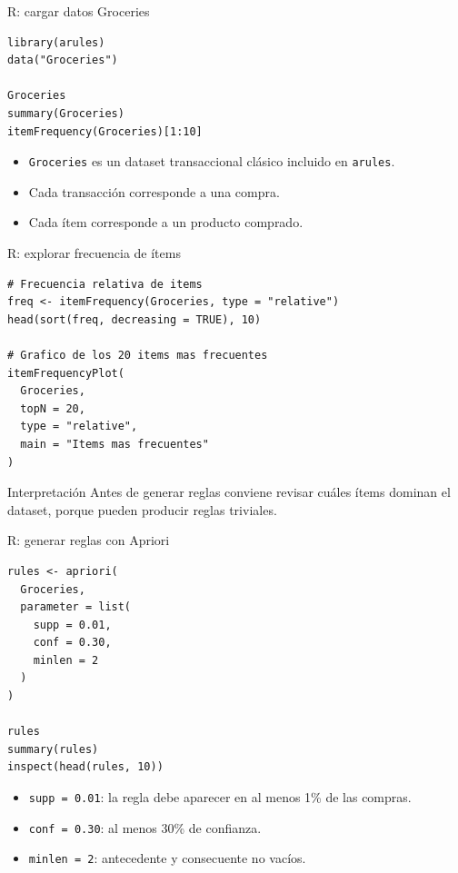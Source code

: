 \documentclass[10pt,aspectratio=169]{beamer}
\begin{document}
\begin{frame}[fragile]{R: cargar datos Groceries}
\begin{lstlisting}[style=Rstyle]
library(arules)
data("Groceries")

Groceries
summary(Groceries)
itemFrequency(Groceries)[1:10]
\end{lstlisting}

\begin{itemize}
  \item \texttt{Groceries} es un dataset transaccional clásico incluido en \texttt{arules}.
  \item Cada transacción corresponde a una compra.
  \item Cada ítem corresponde a un producto comprado.
\end{itemize}
\end{frame}

\begin{frame}[fragile]{R: explorar frecuencia de ítems}
\begin{lstlisting}[style=Rstyle]
# Frecuencia relativa de items
freq <- itemFrequency(Groceries, type = "relative")
head(sort(freq, decreasing = TRUE), 10)

# Grafico de los 20 items mas frecuentes
itemFrequencyPlot(
  Groceries,
  topN = 20,
  type = "relative",
  main = "Items mas frecuentes"
)
\end{lstlisting}

\begin{block}{Interpretación}
Antes de generar reglas conviene revisar cuáles ítems dominan el dataset, porque pueden producir reglas triviales.
\end{block}
\end{frame}

\begin{frame}[fragile]{R: generar reglas con Apriori}
\begin{lstlisting}[style=Rstyle]
rules <- apriori(
  Groceries,
  parameter = list(
    supp = 0.01,
    conf = 0.30,
    minlen = 2
  )
)

rules
summary(rules)
inspect(head(rules, 10))
\end{lstlisting}

\begin{itemize}
  \item \texttt{supp = 0.01}: la regla debe aparecer en al menos 1\% de las compras.
  \item \texttt{conf = 0.30}: al menos 30\% de confianza.
  \item \texttt{minlen = 2}: antecedente y consecuente no vacíos.
\end{itemize}
\end{frame}
\end{document}
